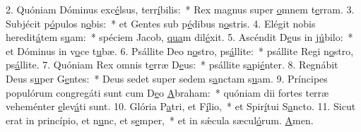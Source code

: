2. Quóniam Dóminus exc\uline{é}lsus, terr\uline{í}bilis:~* Rex magnus super \uline{o}mnem t\uline{e}rram.
3. Subjécit p\uline{ó}pulos n\uline{o}bis:~* et Gentes sub p\uline{é}dibus n\uline{o}stris.
4. Elégit nobis heredit\uline{á}tem s\uline{u}am:~* spéciem Jacob, \uline{qua}m dil\uline{é}xit.
5. Ascéndit D\uline{e}us in j\uline{ú}bilo:~* et Dóminus in v\uline{o}ce t\uline{u}bæ.
6. Psállite Deo n\uline{o}stro, ps\uline{á}llite:~* psállite Regi n\uline{o}stro, ps\uline{á}llite.
7. Quóniam Rex omnis t\uline{e}rræ D\uline{e}us:~* psállite s\uline{a}pi\uline{é}nter.
8. Regnábit Deus s\uline{u}per G\uline{e}ntes:~* Deus sedet super sedem s\uline{a}nctam s\uline{u}am.
9. Príncipes populórum congregáti sunt cum D\uline{e}o \uline{A}braham:~* quóniam dii fortes terræ veheménter \uline{e}lev\uline{á}ti sunt.
10. Glória P\uline{a}tri, et F\uline{í}lio,~* et Spir\uline{í}tui S\uline{a}ncto.
11. Sicut erat in princípio, et n\uline{u}nc, et s\uline{e}mper,~* et in sǽcula sæcul\uline{ó}rum. \uline{A}men.
